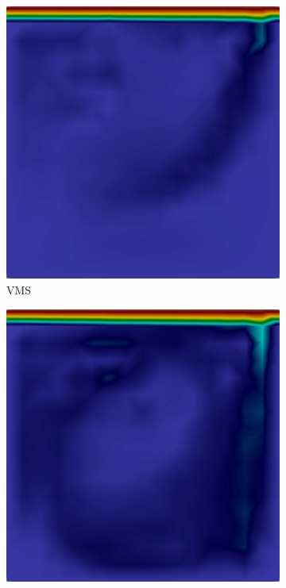 \begin{figure}[h!]
\begin{subfigure}{0.32\textwidth}
        \includegraphics[width=\linewidth]{Figuras/cavity3D/VMS.png}
        \caption{VMS}
    \end{subfigure}
    \begin{subfigure}{0.32\textwidth}
        \centering
        \includegraphics[width=\linewidth]{Figuras/cavity3D/LES.png}

\end{subfigure}
\end{figure}

